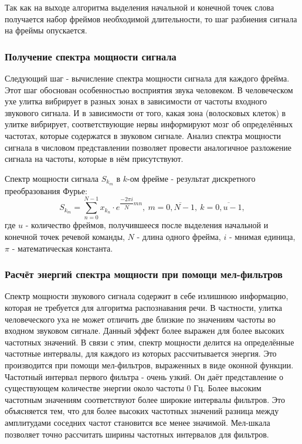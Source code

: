 Так как на выходе алгоритма выделения начальной и конечной точек слова получается набор фреймов необходимой длительности, то шаг разбиения сигнала на фреймы опускается.

\subsubsection{Получение спектра мощности сигнала}
Следующий шаг - вычисление спектра мощности сигнала для каждого фрейма. Этот шаг обоснован особенностью восприятия звука человеком. В человеческом ухе улитка вибрирует в разных зонах в зависимости от частоты входного звукового сигнала. И в зависимости от того, какая зона (волосковых клеток) в улитке вибрирует, соответствующие нервы информируют мозг об определённых частотах, которые содержатся в звуковом сигнале. Анализ спектра мощности сигнала в числовом представлении позволяет провести аналогичное разложение сигнала на частоты, которые в нём присутствуют.

Спектр мощности сигнала $S_{k_m}$ в $k$-ом фрейме - результат дискретного преобразования Фурье:
\begin{equation}
	S_{k_m} = \sum_{n=0}^{N-1} x_{k_n} \cdot e^{\dfrac{-2\pi i}{N}mn},~m=\overline{0,N-1},~k=\overline{0,u-1},
\end{equation}
где $u$ - количество фреймов, получившееся после выделения начальной и конечной точек речевой команды, $N$ - длина одного фрейма, $i$ - мнимая единица, $\pi$ - математическая константа.

\subsubsection{Расчёт энергий спектра мощности при помощи мел-фильтров}
Спектр мощности звукового сигнала содержит в себе излишнюю информацию, которая не требуется для алгоритма распознавания речи. В частности, улитка человеческого уха не может отличить две близкие по значениям частоты во входном звуковом сигнале. Данный эффект более выражен для более высоких частотных значений. В связи с этим, спектр мощности делится на определённые частотные интервалы, для каждого из которых рассчитывается энергия. Это производится при помощи мел-фильтров, выраженных в виде оконной функции. Частотный интервал первого фильтра - очень узкий. Он даёт представление о существующем количестве энергии около частоты 0 Гц. Более высоким частотным значениям соответствуют более широкие интервалы фильтров. Это объясняется тем, что для более высоких частотных значений разница между амплитудами соседних частот становится все менее значимой. Мел-шкала позволяет точно рассчитать ширины частотных интервалов для фильтров.


